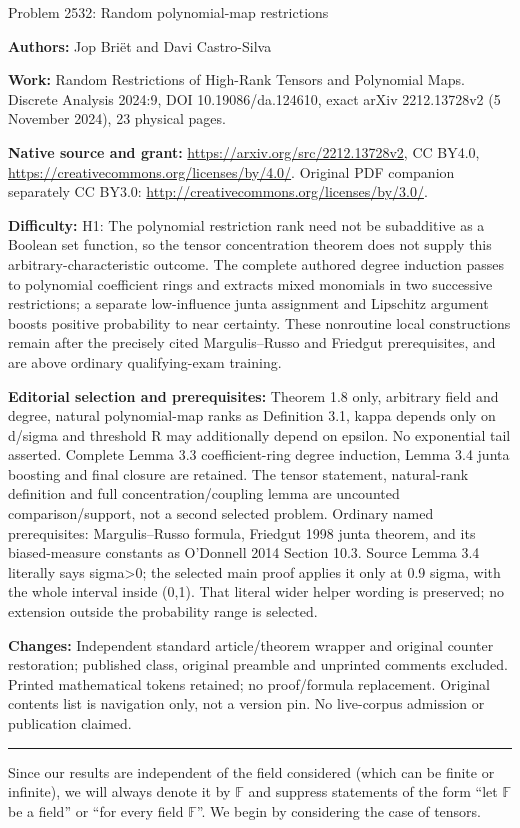 \documentclass[10pt]{article}
\newcommand{\F}{\mathbb{F}}
\newcommand{\1}{\mathbf{1}}
\begin{document}
\begin{center}\Large Problem 2532: Random polynomial-map restrictions\end{center}
\noindent\textbf{Authors:} Jop Bri\"et and Davi Castro-Silva\par
\noindent\textbf{Work:} Random Restrictions of High-Rank Tensors and Polynomial Maps. Discrete Analysis 2024:9, DOI 10.19086/da.124610, exact arXiv 2212.13728v2 (5 November 2024), 23 physical pages.\par
\noindent\textbf{Native source and grant:} \url{https://arxiv.org/src/2212.13728v2}, CC BY4.0, \url{https://creativecommons.org/licenses/by/4.0/}. Original PDF companion separately CC BY3.0: \url{http://creativecommons.org/licenses/by/3.0/}.\par
\noindent\textbf{Difficulty:} H1: The polynomial restriction rank need not be subadditive as a Boolean set function, so the tensor concentration theorem does not supply this arbitrary-characteristic outcome. The complete authored degree induction passes to polynomial coefficient rings and extracts mixed monomials in two successive restrictions; a separate low-influence junta assignment and Lipschitz argument boosts positive probability to near certainty. These nonroutine local constructions remain after the precisely cited Margulis--Russo and Friedgut prerequisites, and are above ordinary qualifying-exam training.\par
\noindent\textbf{Editorial selection and prerequisites:} Theorem 1.8 only, arbitrary field and degree, natural polynomial-map ranks as Definition 3.1, kappa depends only on d/sigma and threshold R may additionally depend on epsilon. No exponential tail asserted. Complete Lemma 3.3 coefficient-ring degree induction, Lemma 3.4 junta boosting and final closure are retained. The tensor statement, natural-rank definition and full concentration/coupling lemma are uncounted comparison/support, not a second selected problem. Ordinary named prerequisites: Margulis--Russo formula, Friedgut 1998 junta theorem, and its biased-measure constants as O'Donnell 2014 Section 10.3. Source Lemma 3.4 literally says sigma>0; the selected main proof applies it only at 0.9 sigma, with the whole interval inside (0,1). That literal wider helper wording is preserved; no extension outside the probability range is selected.\par
\noindent\textbf{Changes:} Independent standard article/theorem wrapper and original counter restoration; published class, original preamble and unprinted comments excluded. Printed mathematical tokens retained; no proof/formula replacement. Original contents list is navigation only, not a version pin. No live-corpus admission or publication claimed.\par\medskip\hrule\medskip
\setcounter{section}{1}\setcounter{theorem}{1}
Since our results are independent of the field considered (which can be finite or infinite), we will always denote it by $\F$ and suppress statements of the form ``let $\F$ be a field'' or ``for every field $\F$''.
We begin by considering the case of tensors.
\end{document}
